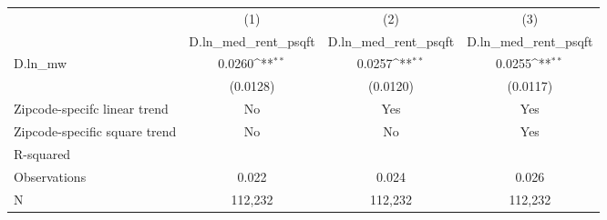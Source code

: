 {
\def\sym#1{\ifmmode^{#1}\else\(^{#1}\)\fi}
\begin{tabular}{l*{3}{c}}
\hline\hline
          &\multicolumn{1}{c}{(1)}&\multicolumn{1}{c}{(2)}&\multicolumn{1}{c}{(3)}\\
          &\multicolumn{1}{c}{D.ln\_med\_rent\_psqft}&\multicolumn{1}{c}{D.ln\_med\_rent\_psqft}&\multicolumn{1}{c}{D.ln\_med\_rent\_psqft}\\
\hline
D.ln\_mw   &   0.0260\sym{**} &   0.0257\sym{**} &   0.0255\sym{**} \\
          & (0.0128)         & (0.0120)         & (0.0117)         \\
\hline
Zipcode-specifc linear trend&       No         &      Yes         &      Yes         \\
Zipcode-specific square trend&       No         &       No         &      Yes         \\
R-squared &                  &                  &                  \\
Observations&    0.022         &    0.024         &    0.026         \\
N         &  112,232         &  112,232         &  112,232         \\
\hline\hline
\end{tabular}
}
